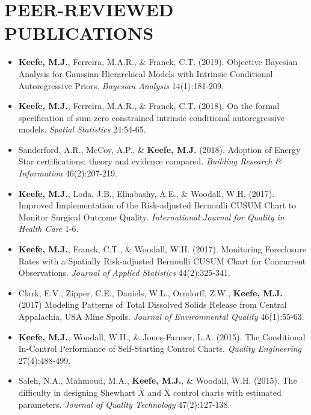 \documentclass[10pt]{article}
\begin{document}
\section*{PEER-REVIEWED PUBLICATIONS}
\begin{itemize}
 \item[] \textbf{Keefe, M.J.}, Ferreira, M.A.R., \& Franck, C.T. (2019). Objective Bayesian Analysis for Gaussian Hierarchical Models with Intrinsic Conditional Autoregressive Priors. \textit{Bayesian Analysis} 14(1):181-209.
 
 \item[] \textbf{Keefe, M.J.}, Ferreira, M.A.R., \& Franck, C.T. (2018). On the formal specification of sum-zero constrained intrinsic conditional autoregressive models. \textit{Spatial Statistics} 24:54-65.
 
 \item[] Sanderford, A.R., McCoy, A.P., \& \textbf{Keefe, M.J.} (2018). Adoption of Energy Star certifications: theory and evidence compared. \textit{Building Research \& Information} 46(2):207-219.
 
 \item[] \textbf{Keefe, M.J.}, Loda, J.B., Elhabashy, A.E., \& Woodall, W.H. (2017). Improved Implementation of the Risk-adjusted Bernoulli CUSUM Chart to Monitor Surgical Outcome Quality. \textit{International Journal for Quality in Health Care} 1-6.
 
\item[] \textbf{Keefe, M.J.}, Franck, C.T., \& Woodall, W.H. (2017). Monitoring Foreclosure Rates with a Spatially Risk-adjusted Bernoulli CUSUM Chart for Concurrent Observations. \textit{Journal of Applied Statistics} 44(2):325-341.

\item[] Clark, E.V., Zipper, C.E., Daniels, W.L., Orndorff, Z.W., \textbf{Keefe, M.J.} (2017) Modeling Patterns of Total Dissolved Solids Release from Central Appalachia, USA Mine Spoils. \textit{Journal of Environmental Quality} 46(1):55-63.

\item[] \textbf{Keefe, M.J.}, Woodall, W.H., \& Jones-Farmer, L.A. (2015). The Conditional In-Control Performance of Self-Starting Control Charts. \textit{Quality Engineering} 27(4):488-499.

\item[] Saleh, N.A., Mahmoud, M.A., \textbf{Keefe, M.J.}, \& Woodall, W.H. (2015). The difficulty in designing Shewhart $\bar{X}$ and X control charts with estimated parameters. \textit{Journal of Quality Technology} 47(2):127-138.


\end{itemize}
\end{document}
